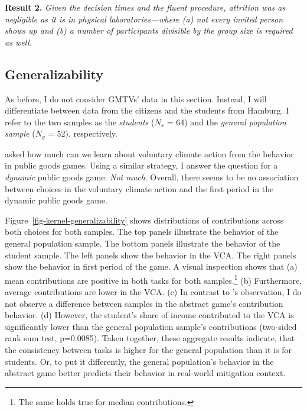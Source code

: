 \documentclass[
  authoryear,
  preprint,
  3p]{elsarticle}
\begin{document}
\textbf{Result 2.} \emph{Given the decision times and the fluent
procedure, attrition was as negligible as it is in physical
laboratories---where (a) not every invited person shows up and (b) a
number of participants divisible by the group size is required as well.}

\hypertarget{sec-generalizability}{%
\subsection{Generalizability}\label{sec-generalizability}}

As before, I do not consider GMTVs' data in this section. Instead, I
will differentiate between data from the citizens and the students from
Hamburg. I refer to the two samples as the \emph{students} (\(N_s\) =
64) and the \emph{general population sample} (\(N_g\) = 52),
respectively.

\citet{GKLS2020} asked how much can we learn about voluntary climate
action from the behavior in public goods games. Using a similar
strategy, I answer the question for a \emph{dynamic} public goods game:
\emph{Not much}. Overall, there seems to be no association between
choices in the voluntary climate action and the first period in the
dynamic public goods game.

Figure~\ref{fig-kernel-generalizability} shows distributions of
contributions across both choices for both samples. The top panels
illustrate the behavior of the general population sample. The bottom
panels illustrate the behavior of the student sample. The left panels
show the behavior in the VCA. The right panels show the behavior in
first period of the game. A visual inspection shows that (a) mean
contributions are positive in both tasks for both samples.\footnote{The
  same holds true for median contributions.} (b) Furthermore, average
contributions are lower in the VCA. (c) In contrast to
\citet{GKLS2020}'s observation, I do not observe a difference between
samples in the abstract game's contribution behavior. (d) However, the
student's share of income contributed to the VCA is significantly lower
than the general population sample's contributions (two-sided rank sum
test, p=0.0085). Taken together, these aggregate results indicate, that
the consistency between tasks is higher for the general population than
it is for students. Or, to put it differently, the general population's
behavior in the abstract game better predicts their behavior in
real-world mitigation context.
\end{document}
